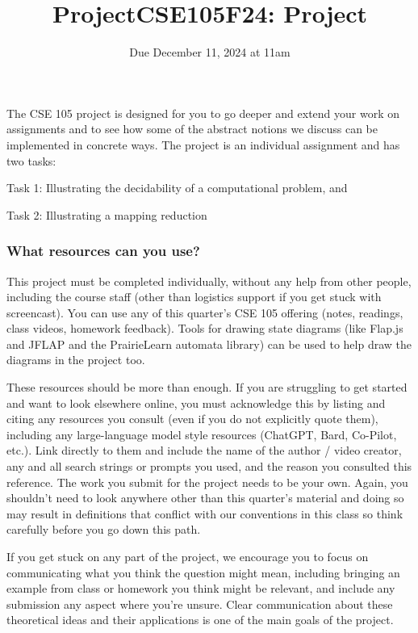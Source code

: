 \documentclass[12pt, oneside]{article}
\begin{document}
\title{ProjectCSE105F24: Project}
\date{Due December 11, 2024 at 11am}


\maketitle

\thispagestyle{fancy}


The CSE 105 project is designed for you to go deeper and 
extend your work on assignments 
and to see how some of the abstract notions we discuss can 
be implemented in concrete ways. 
The project is an individual assignment and has two tasks: 

Task 1: Illustrating the decidability of a computational problem, and

Task 2: Illustrating a mapping reduction

\subsubsection*{What resources can you use?} This project must be completed individually, 
without any help from other people, including the course staff (other than logistics support if 
you get stuck with screencast).
You can use any of this quarter's CSE 105 offering (notes, readings, class videos, homework feedback). 
Tools for drawing state diagrams (like Flap.js and JFLAP and the PrairieLearn automata library) can be used to help draw the diagrams 
in the project too.

These resources should be more than enough.
If you are struggling to get started and want to look elsewhere online, 
you must acknowledge this by listing and citing any resources you consult 
(even if you do not explicitly quote them), including any large-language model style resources (ChatGPT, Bard, Co-Pilot, etc.). 
Link directly to them and include the name of the author / video creator, 
any and all search strings or prompts you used, and the reason you consulted this reference. The work you submit for the project needs to be your own. Again, you shouldn't need to look anywhere 
other than this quarter's material and doing so may result in definitions that
conflict with our conventions in this class so think carefully before you go down this path.

If you get stuck on any part of the project, we encourage you to focus on communicating what you think 
the question might mean, including bringing an example from class or homework you think might be relevant, and 
include any submission any aspect where you're unsure. Clear communication about these
theoretical ideas and their applications is one of the main goals of the project.
\end{document}
